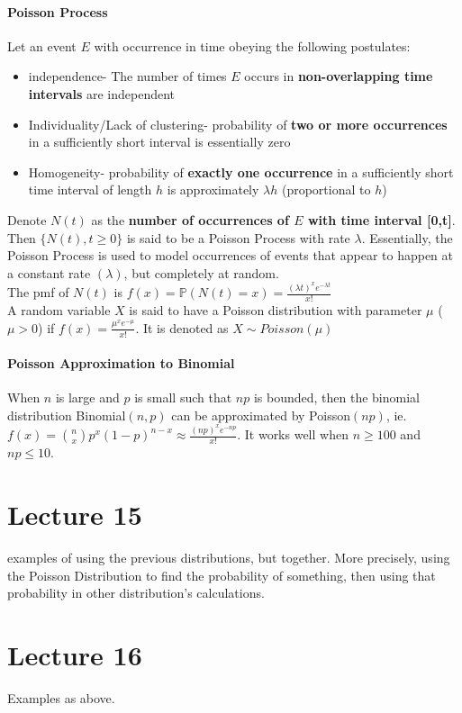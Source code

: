 \documentclass[10pt,letter]{article}
\begin{document}
\paragraph{Poisson Process}
Let an event $E$ with occurrence in time obeying the following postulates: 
\begin{itemize}
    \item independence- The number of times $E$ occurs in \textbf{non-overlapping time intervals} are independent
    \item Individuality/Lack of clustering- probability of \textbf{two or more occurrences} in a sufficiently short interval is essentially zero 
    \item Homogeneity- probability of \textbf{exactly one occurrence} in a sufficiently short time interval of length $h$ is approximately $\lambda h$ (proportional to $h$) 
\end{itemize}
Denote $N(t)$ as the \textbf{number of occurrences of $E$ with time interval [0,t]}. Then $\{N(t),t\geq0\}$ is said to be a Poisson Process with rate $\lambda$. Essentially, the Poisson Process is used to model occurrences of events that appear to happen at a constant rate $(\lambda)$, but completely at random. \\ 
The pmf of $N(t)$ is $f(x)=\mathbb{P}(N(t)=x)=\frac{(\lambda t)^xe^{-\lambda t}}{x!}$ \\ 
A random variable $X$ is said to have a Poisson distribution with parameter $\mu$ ($\mu>0$) if $f(x)=\frac{\mu^xe^{-\mu}}{x!}$. It is denoted as $X\sim Poisson(\mu)$ 

\paragraph{Poisson Approximation to Binomial} 
When $n$ is large and $p$ is small such that $np$ is bounded, then the binomial distribution Binomial$(n,p)$ can be approximated by Poisson$(np)$, ie. $f(x)={n\choose x}p^x(1-p)^{n-x}\approx \frac{(np)^xe^{-np}}{x!}$. It works well when $n\geq100$ and $np\leq10$. 

\section*{Lecture 15}
examples of using the previous distributions, but together. More precisely, using the Poisson Distribution to find the probability of something, then using that probability in other distribution's calculations.

\section*{Lecture 16}
Examples as above. 
\end{document}
